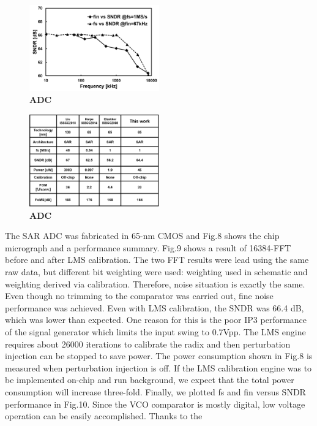 \documentclass[letterpaper, 10 pt, conference]{ieeeconf}  %
\begin{document}
\begin{figure}[ht!]
\centering
 \includegraphics[width=0.5\textwidth]{figs/freq-sndr.png}
  \captionsetup{font=footnotesize}
  \caption{\textbf{ADC}}
  \label{highlight}
\end{figure}

\begin{figure}[ht!]
\centering
 \includegraphics[width=0.5\textwidth]{figs/table.png}
  \captionsetup{font=footnotesize}
  \caption{\textbf{ADC}}
  \label{highlight}
\end{figure}

The SAR ADC was fabricated in 65-nm CMOS and Fig.8 shows the chip micrograph and a performance summary. 
Fig.9 shows a result of 16384-FFT before and after LMS calibration. The two FFT results were lead using the same raw data, but different bit weighting were used: weighting used in schematic and weighting derived via calibration. Therefore, noise situation is exactly the same. Even though no trimming to the comparator was carried out, fine noise performance was achieved. Even with LMS calibration, the SNDR was 66.4 dB, which was lower than expected. One reason for this is the poor IP3 performance of the signal generator which limits the input swing to 0.7Vpp.  The LMS engine requires about 26000 iterations to calibrate the radix and then perturbation injection can be stopped to save power. The power consumption shown in Fig.8 is measured when perturbation injection is off. If the LMS calibration engine was to be implemented on-chip and run background, we expect that the total power consumption will increase three-fold.
Finally, we plotted fs and fin versus SNDR performance in Fig.10. Since the VCO comparator is mostly digital, low voltage operation can be easily accomplished.  Thanks to the 
 
\end{document}
